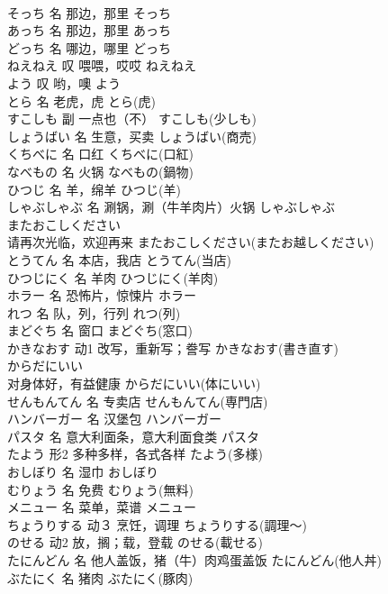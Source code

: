 \documentclass[8pt]{extreport}
\begin{document}
\begin{CJK}{UTF8}{min}
\\	そっち	名	那边，那里	そっち	
\\	あっち	名	那边，那里	あっち	
\\	どっち	名	哪边，哪里	どっち	
\\	ねえねえ	叹	喂喂，哎哎	ねえねえ	
\\	よう	叹	哟，噢	よう	
\\	とら	名	老虎，虎	とら(虎)	
\\	すこしも	副	一点也（不）	すこしも(少しも)	
\\	しょうばい	名	生意，买卖	しょうばい(商売)	
\\	くちべに	名	口红	くちべに(口紅)	
\\	なべもの	名	火锅	なべもの(鍋物)	
\\	ひつじ	名	羊，绵羊	ひつじ(羊)	
\\	しゃぶしゃぶ	名	涮锅，涮（牛羊肉片）火锅	しゃぶしゃぶ	
\\	またおこしください	
\\	请再次光临，欢迎再来	またおこしください(またお越しください)	
\\	とうてん	名	本店，我店	とうてん(当店)	
\\	ひつじにく	名	羊肉	ひつじにく(羊肉)	
\\	ホラー	名	恐怖片，惊悚片	ホラー	
\\	れつ	名	队，列，行列	れつ(列)	
\\	まどぐち	名	窗口	まどぐち(窓口)	
\\	かきなおす	动1	改写，重新写；誊写	かきなおす(書き直す)	
\\	からだにいい	
\\	对身体好，有益健康	からだにいい(体にいい)	
\\	せんもんてん	名	专卖店	せんもんてん(専門店)	
\\	ハンバーガー	名	汉堡包	ハンバーガー	
\\	パスタ	名	意大利面条，意大利面食类	パスタ	
\\	たよう	形2	多种多样，各式各样	たよう(多様)	
\\	おしぼり	名	湿巾	おしぼり	
\\	むりょう	名	免费	むりょう(無料)	
\\	メニュー	名	菜单，菜谱	メニュー	
\\	ちょうりする	动３	烹饪，调理	ちょうりする(調理～)	
\\	のせる	动2	放，搁；载，登载	のせる(載せる)	
\\	たにんどん	名	他人盖饭，猪（牛）肉鸡蛋盖饭	たにんどん(他人丼)	
\\	ぶたにく	名	猪肉	ぶたにく(豚肉)	

\end{CJK}
\end{document}
